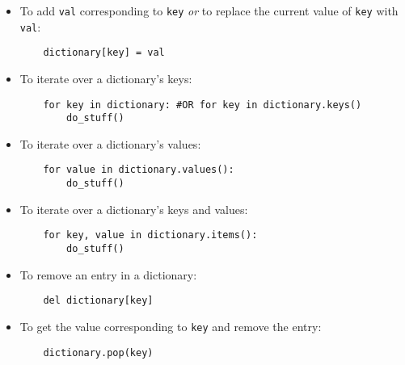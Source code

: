 \begin{itemize}
\item To add {\tt val} corresponding to {\tt key} {\it or} to replace the current value of {\tt key} with {\tt val}:
\begin{lstlisting}
    dictionary[key] = val
\end{lstlisting}
\item To iterate over a dictionary's keys:
\begin{lstlisting}
    for key in dictionary: #OR for key in dictionary.keys()
        do_stuff()
\end{lstlisting}
\item To iterate over a dictionary's values:
\begin{lstlisting}
    for value in dictionary.values():
        do_stuff()
\end{lstlisting}
\item To iterate over a dictionary's keys and values:
\begin{lstlisting}
    for key, value in dictionary.items():
        do_stuff()
\end{lstlisting}
\item To remove an entry in a dictionary:
\begin{lstlisting}
    del dictionary[key]
\end{lstlisting}
\item To get the value corresponding to {\tt key} and remove the entry:
\begin{lstlisting}
    dictionary.pop(key)
\end{lstlisting} 
\end{itemize}
